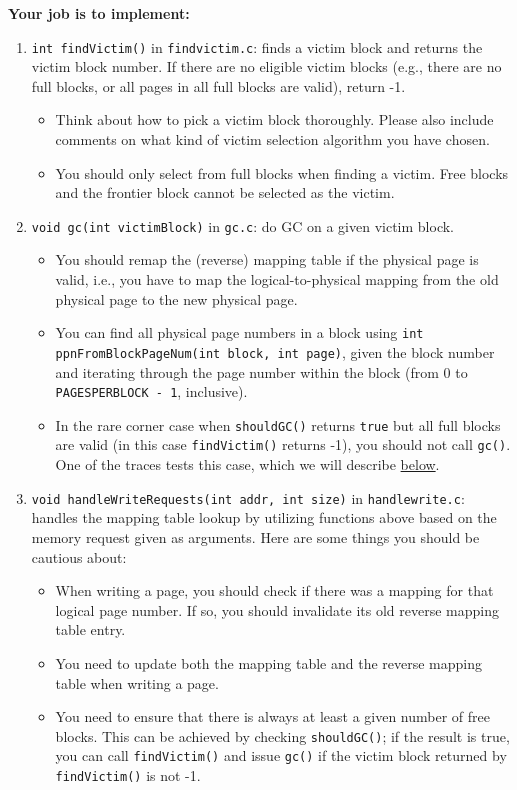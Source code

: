 \documentclass[11pt]{article}
\begin{document}
\textbf{Your job is to implement:}
\begin{enumerate}
    \item \texttt{int findVictim()} in \texttt{findvictim.c}: finds a victim block and returns the victim block number. If there are no eligible victim blocks (e.g., there are no full blocks, or all pages in all full blocks are valid), return -1.
    \begin{itemize}
        \item Think about how to pick a victim block thoroughly. Please also include comments on what kind of victim selection algorithm you have chosen. 
        \item You should only select from full blocks when finding a victim. Free blocks and the frontier block cannot be selected as the victim.
    \end{itemize}
    \item \texttt{void gc(int victimBlock)} in \texttt{gc.c}: do GC on a given victim block.
    \begin{itemize}
        \item You should remap the (reverse) mapping table if the physical page is valid, i.e., you have to map the logical-to-physical mapping from the old physical page to the new physical page.
        \item You can find all physical page numbers in a block using \texttt{int ppnFromBlockPageNum(int block, int page)}, given the block number and iterating through the page number within the block (from 0 to \texttt{PAGESPERBLOCK - 1}, inclusive).
        \item In the rare corner case when \texttt{shouldGC()} returns \texttt{true} but all full blocks are valid (in this case \texttt{findVictim()} returns -1), you should not call \texttt{gc()}. One of the traces tests this case, which we will describe \hyperref[sec:traces]{below}.
    \end{itemize}
    \item \texttt{void handleWriteRequests(int addr, int size)} in \texttt{handlewrite.c}: handles the mapping table lookup by utilizing functions above based on the memory request given as arguments. Here are some things you should be cautious about:
    \begin{itemize}
        \item When writing a page, you should check if there was a mapping for that logical page number. If so, you should invalidate its old reverse mapping table entry. 
        \item You need to update both the mapping table and the reverse mapping table when writing a page.
        \item You need to ensure that there is always at least a given number of free blocks. This can be achieved by checking \texttt{shouldGC()}; if the result is true, you can call \texttt{findVictim()} and issue \texttt{gc()} if the victim block returned by \texttt{findVictim()} is not -1.
    \end{itemize}
\end{enumerate}
\end{document}
